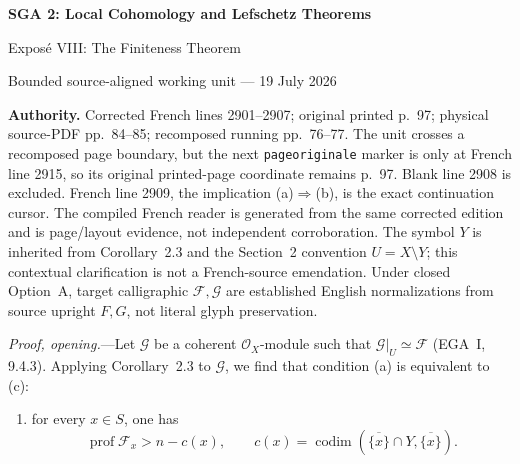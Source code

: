 \documentclass[10pt,a4paper]{article}
\newcommand{\cF}{\mathcal F}
\newcommand{\cG}{\mathcal G}
\newcommand{\cO}{\mathcal O}
\newcommand{\prof}{\operatorname{prof}}
\newcommand{\codimn}{\operatorname{codim}}
\begin{document}
\begin{center}
  {\Large\bfseries SGA 2: Local Cohomology and Lefschetz Theorems}\par\smallskip
  {\large Expos\'e VIII: The Finiteness Theorem}\par
  \small Bounded source-aligned working unit --- 19 July 2026
\end{center}
\noindent\colorbox{softgray}{\parbox{0.95\linewidth}{\footnotesize\textbf{Authority.}
Corrected French lines 2901--2907; original printed p.~97; physical
source-PDF pp.~84--85; recomposed running pp.~76--77. The unit crosses a
recomposed page boundary, but the next \texttt{pageoriginale} marker is only
at French line 2915, so its original printed-page coordinate remains p.~97.
Blank line 2908 is excluded. French line 2909, the implication
\textup{(a)}$\Rightarrow$\textup{(b)}, is the exact continuation cursor. The
compiled French reader is generated from the same corrected edition and is
page/layout evidence, not independent corroboration. The symbol $Y$ is
inherited from Corollary~2.3 and the Section~2 convention $U=X\setminus Y$;
this contextual clarification is not a French-source emendation. Under closed
Option~A, target calligraphic $\cF,\cG$ are established English
normalizations from source upright $F,G$, not literal glyph preservation.}}

\medskip
\noindent\textit{Proof, opening.}---Let $\cG$ be a coherent $\cO_X$-module
such that $\cG|_U\simeq\cF$ (EGA~I, 9.4.3). Applying Corollary~2.3 to
$\cG$, we find that condition \textup{(a)} is equivalent to \textup{(c)}:
\begin{enumerate}
\item[(c)] for every $x\in S$, one has
\[
  \prof\cF_x>n-c(x),
  \qquad
  c(x)=\codimn(\overline{\{x\}}\cap Y,\overline{\{x\}}).
\]
\end{enumerate}
\end{document}
